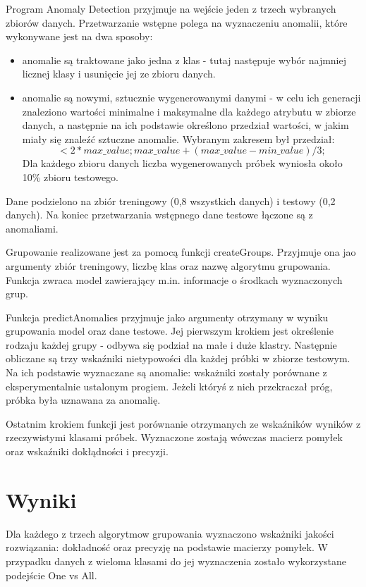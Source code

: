 \documentclass[11pt,a4paper,twoside]{article}
\begin{document}
Program Anomaly Detection przyjmuje na wejście jeden z trzech wybranych zbiorów danych. Przetwarzanie wstępne polega na  wyznaczeniu anomalii, które wykonywane jest na dwa sposoby:
\begin{itemize}
\item anomalie są traktowane jako jedna z klas - tutaj następuje wybór najmniej licznej klasy i usunięcie jej ze zbioru danych.
\item anomalie są nowymi, sztucznie wygenerowanymi danymi - w celu ich generacji znaleziono wartości minimalne i maksymalne dla każdego atrybutu w zbiorze danych, a następnie na ich podstawie określono przedział wartości, w jakim miały się znaleźć sztuczne anomalie. Wybranym zakresem był przedział: 
$$ <2*max\_value; max\_value + (max\_value - min\_value)/3 ;$$
Dla każdego zbioru danych liczba wygenerowanych próbek wyniosła około 10\% zbioru testowego.
\end{itemize}
Dane podzielono na zbiór treningowy (0,8 wszystkich danych) i testowy (0,2 danych). Na koniec przetwarzania wstępnego dane testowe łączone są z anomaliami.

Grupowanie realizowane jest za pomocą funkcji createGroups. Przyjmuje ona jao argumenty zbiór treningowy, liczbę klas oraz nazwę algorytmu grupowania. Funkcja zwraca model zawierający m.in. informacje o środkach wyznaczonych grup.

Funkcja predictAnomalies przyjmuje jako argumenty otrzymany w wyniku grupowania model oraz dane testowe. Jej pierwszym krokiem jest określenie rodzaju każdej grupy - odbywa się podział na małe i duże klastry. Następnie obliczane są trzy wskaźniki nietypowości dla każdej próbki w zbiorze testowym. Na ich podstawie wyznaczane są anomalie: wskażniki zostały porównane z eksperymentalnie ustalonym progiem. Jeżeli któryś z nich przekraczał próg, próbka była uznawana za anomalię.

Ostatnim krokiem funkcji jest porównanie otrzymanych ze wskaźników wyników z rzeczywistymi klasami próbek. Wyznaczone zostają wówczas macierz pomyłek oraz wskaźniki dokłądności i precyzji.


\section{Wyniki}

Dla każdego z trzech algorytmow grupowania wyznaczono wskażniki jakości rozwiązania: dokładność oraz precyzję na podstawie macierzy pomyłek. W przypadku danych z wieloma klasami do jej wyznaczenia zostało wykorzystane podejście One vs All.
\end{document}

